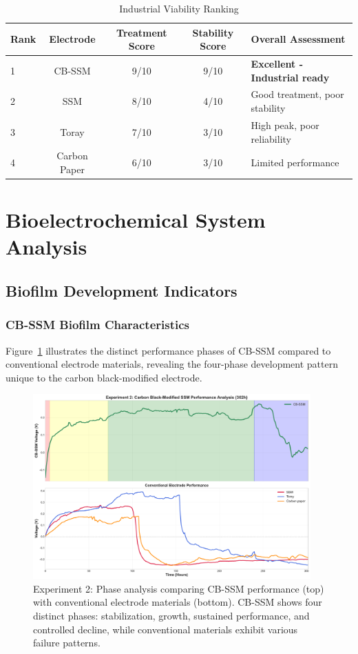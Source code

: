 \documentclass[12pt,a4paper]{article}
\begin{document}
\begin{table}[htbp]
\centering
\caption{Industrial Viability Ranking}
\label{tab:industrial_ranking}
\begin{tabular}{@{}lcccl@{}}
\toprule
\textbf{Rank} & \textbf{Electrode} & \textbf{Treatment Score} & \textbf{Stability Score} & \textbf{Overall Assessment} \\
\midrule
1 & CB-SSM & 9/10 & 9/10 & \textbf{Excellent - Industrial ready} \\
2 & SSM & 8/10 & 4/10 & Good treatment, poor stability \\
3 & Toray & 7/10 & 3/10 & High peak, poor reliability \\
4 & Carbon Paper & 6/10 & 3/10 & Limited performance \\
\bottomrule
\end{tabular}
\end{table}

\section{Bioelectrochemical System Analysis}

\subsection{Biofilm Development Indicators}

\subsubsection{CB-SSM Biofilm Characteristics}

Figure~\ref{fig:phase_analysis_exp2} illustrates the distinct performance phases of CB-SSM compared to conventional electrode materials, revealing the four-phase development pattern unique to the carbon black-modified electrode.

\begin{figure}[htbp]
\centering
\includegraphics[width=0.95\textwidth]{experiment_2_phase_analysis.pdf}
\caption{Experiment 2: Phase analysis comparing CB-SSM performance (top) with conventional electrode materials (bottom). CB-SSM shows four distinct phases: stabilization, growth, sustained performance, and controlled decline, while conventional materials exhibit various failure patterns.}
\label{fig:phase_analysis_exp2}
\end{figure}
\end{document}
